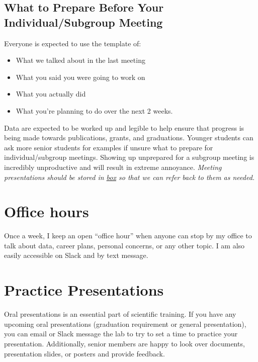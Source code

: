 \documentclass[
]{book}
\begin{document}
\hypertarget{subgroup}{%
\subsection{What to Prepare Before Your Individual/Subgroup Meeting}\label{subgroup}}

Everyone is expected to use the template of:

\begin{itemize}
\item
  What we talked about in the last meeting
\item
  What you said you were going to work on
\item
  What you actually did
\item
  What you're planning to do over the next 2 weeks.
\end{itemize}

Data are expected to be worked up and legible to help ensure that progress is being made towards publications, grants, and graduations. Younger students can ask more senior students for examples if unsure what to prepare for individual/subgroup meetings. Showing up unprepared for a subgroup meeting is incredibly unproductive and will result in extreme annoyance. \emph{Meeting presentations should be stored in \protect\hyperlink{vanderbiltbox}{box} so that we can refer back to them as needed.}

\hypertarget{office-hours}{%
\section{Office hours}\label{office-hours}}

Once a week, I keep an open ``office hour'' when anyone can stop by my office to talk about data, career plans, personal concerns, or any other topic. I am also easily accessible on Slack and by text message.

\hypertarget{practice}{%
\section{Practice Presentations}\label{practice}}

Oral presentations is an essential part of scientific training. If you have any upcoming oral presentations (graduation requirement or general presentation), you can email or Slack message the lab to try to set a time to practice your presentation. Additionally, senior members are happy to look over documents, presentation slides, or posters and provide feedback.
\end{document}
